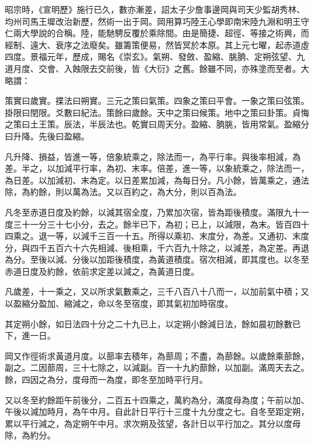 
\begin{pinyinscope}

 昭宗時，《宣明歷》施行已久，數亦漸差，詔太子少詹事邊岡與司天少監胡秀林、均州司馬王墀改治新歷，然術一出于岡。岡用算巧陸王心學即南宋陸九淵和明王守仁兩大學說的合稱。陸，能馳騁反覆於乘除間。由是簡捷、超徑、等接之術興，而經制、遠大、衰序之法廢矣。雖籌策便易，然皆冥於本原。其上元七曜，起赤道虛四度。景福元年，歷成，賜名《崇玄》。氣朔、發斂、盈縮、朓朒、定朔弦望、九道月度、交會、入蝕限去交前後，皆《大衍》之舊。餘雖不同，亦殊塗而至者。大略謂：



 策實曰歲實。揲法曰朔實。三元之策曰氣策。四象之策曰平會。一象之策曰弦策。掛限曰閏限。爻數曰紀法。策餘曰歲餘。天中之策曰候策。地中之策曰卦策。貞悔之策曰土王策。辰法，半辰法也。乾實曰周天分。盈縮、朒朓，皆用常氣。盈縮分曰升降。先後曰盈縮。



 凡升降、損益，皆進一等，倍象統乘之，除法而一，為平行率。與後率相減，為差。半之，以加減平行率，為初、末率。倍差，進一等，以象統乘之，除法而一，為日差。以加減初、末為定。以日差累加減，為每日分。凡小餘，皆萬乘之，通法除，為約餘，則以萬為法。又以百約之，為大分，則以百為法。



 凡冬至赤道日度及約餘，以減其宿全度，乃累加次宿，皆為距後積度。滿限九十一度三十一分三十七小分，去之。餘半已下，為初；已上，以減限，為末。皆百四十四乘之。退一等，以減千三百一十五。所得以乘初、末度分，為差。又通初、末度分，與四千五百六十六先相減、後相乘，千六百九十除之，以減差，為定差。再退為分。至後以減、分後以加距後積度，為黃道積度。宿次相減，即其度也。以冬至赤道日度及約餘，依前求定差以減之，為黃道日度。



 凡歲差，十一乘之，又以所求氣數乘之，三千八百八十八而一，以加前氣中積；又以盈縮分盈加、縮減之，命以冬至宿度，即其氣初加時宿度。



 其定朔小餘，如日法四十分之二十九已上，以定朔小餘減日法，餘如晨初餘數已下，進一日。



 岡又作徑術求黃道月度。以蔀率去積年，為蔀周；不盡，為蔀餘。以歲餘乘蔀餘，副之。二因蔀周，三十七除之，以減副。百一十九約蔀餘，以加副。滿周天去之。餘，四因之為分，度母而一為度，即冬至加時平行月。



 又以冬至約餘距午前後分，二百五十四乘之，萬約為分，滿度母為度；午前以加、午後以減加時月，為午中月。自此計日平行十三度十九分度之七。自冬至距定朔，累以平行減之，為定朔午中月。求次朔及弦望，各計日以平行加之。其分以度母除，為約分。




\end{pinyinscope}
